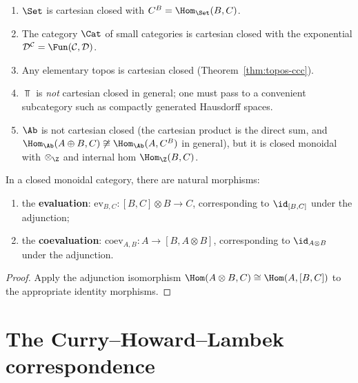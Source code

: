 \begin{example}\label{ex:cartesian-closed}
\begin{enumerate}[label=(\roman*)]
\item $\Set$ is cartesian closed with $C^B = \Hom_{\Set}(B,C)$.
\item The category $\Cat$ of small categories is cartesian closed with
      the exponential $\mathcal{D}^\mathcal{C} = \Fun(\mathcal{C},\mathcal{D})$.
\item Any elementary topos is cartesian closed (Theorem~\ref{thm:topos-ccc}).
\item $\Top$ is \emph{not} cartesian closed in general; one must pass to
      a convenient subcategory such as compactly generated Hausdorff spaces.
\item $\Ab$ is not cartesian closed (the cartesian product is the direct
      sum, and $\Hom_\Ab(A\oplus B, C)\not\cong\Hom_\Ab(A, C^B)$ in general),
      but it is closed monoidal with $\otimes_\Z$ and internal hom $\Hom_\Z(B,C)$.
\end{enumerate}
\end{example}

\begin{proposition}\label{prop:eval-coeval}
In a closed monoidal category, there are natural morphisms:
\begin{enumerate}[label=(\alph*)]
\item the \textbf{evaluation}: $\mathrm{ev}_{B,C}\colon [B,C]\otimes B\to C$,
      corresponding to $\id_{[B,C]}$ under the adjunction;
\item the \textbf{coevaluation}: $\mathrm{coev}_{A,B}\colon A\to [B, A\otimes B]$,
      corresponding to $\id_{A\otimes B}$ under the adjunction.
\end{enumerate}
\end{proposition}

\begin{proof}
Apply the adjunction isomorphism
$\Hom(A\otimes B, C)\cong\Hom(A,[B,C])$
to the appropriate identity morphisms.
\end{proof}



\section{The Curry--Howard--Lambek correspondence}%
\label{sec:curry-howard-lambek}

